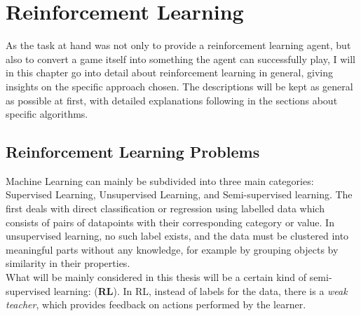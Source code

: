 \chapter{Reinforcement Learning}

\label{ch:RL} 


As the task at hand was not only to provide a reinforcement learning agent, but also to convert a game itself into something the agent can successfully play, I will in this chapter go into detail about reinforcement learning in general, giving insights on the specific approach chosen. The descriptions will be kept as general as possible at first, with detailed explanations following in the sections about specific algorithms.

\section{Reinforcement Learning Problems}

Machine Learning can mainly be subdivided into three main categories: Supervised Learning, Unsupervised Learning, and Semi-supervised learning. The first deals with direct classification or regression using labelled data which consists of pairs of datapoints with their corresponding category or value. In unsupervised learning, no such label exists, and the data must be clustered into meaningful parts without any knowledge, for example by grouping objects by similarity in their properties.\\
What will be mainly considered in this thesis will be a certain kind of semi-supervised learning:  (\textbf{RL}). In RL, instead of labels for the data, there is a \textit{weak teacher}, which provides feedback on actions performed by the learner.

